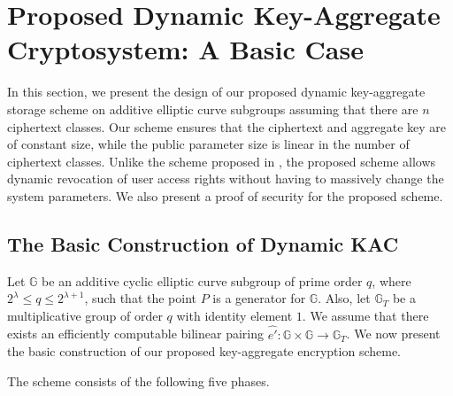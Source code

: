 \section{Proposed Dynamic Key-Aggregate Cryptosystem: A Basic Case}
\label{sec:proposal}

In this section, we present the design of our proposed dynamic key-aggregate storage scheme on additive elliptic curve subgroups assuming that there are $n$ ciphertext classes. Our scheme ensures that the ciphertext and aggregate key are of constant size, while the public parameter size is linear in the number of ciphertext classes. Unlike the scheme proposed in \cite{chu2014key}, the proposed scheme allows dynamic revocation of user access rights without having to massively change the system parameters. We also present a proof of security for the proposed scheme.

\subsection{The Basic Construction of Dynamic KAC}
\label{subsec:construction1}

Let $\mathbb{G}$ be an additive cyclic elliptic curve subgroup of prime order $q$, where $2^{\lambda}\leq q \leq 2^{\lambda + 1}$, such that the point $P$ is a generator for $\mathbb{G}$. Also, let $\mathbb{G}_{T}$ be a multiplicative group of order $q$ with identity element $1$. We assume that there exists an efficiently computable bilinear pairing $\hat{e'}:\mathbb{G} \times \mathbb{G}\longrightarrow\mathbb{G}_T$. We now present the basic construction of our proposed key-aggregate encryption scheme. 

The scheme consists of the following five phases.

